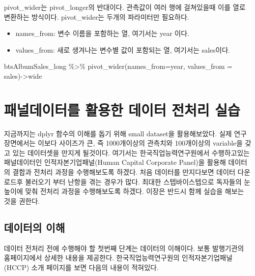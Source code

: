 \documentclass[
]{book}
\newenvironment{Shaded}{\begin{snugshade}}{\end{snugshade}}
\newcommand{\AttributeTok}[1]{\textcolor[rgb]{0.77,0.63,0.00}{#1}}
\newcommand{\FunctionTok}[1]{\textcolor[rgb]{0.00,0.00,0.00}{#1}}
\newcommand{\NormalTok}[1]{#1}
\newcommand{\OtherTok}[1]{\textcolor[rgb]{0.56,0.35,0.01}{#1}}
\newcommand{\SpecialCharTok}[1]{\textcolor[rgb]{0.00,0.00,0.00}{#1}}
\providecommand{\tightlist}{%
  \setlength{\itemsep}{0pt}\setlength{\parskip}{0pt}}
\theoremstyle{definition}
\theoremstyle{definition}
\theoremstyle{definition}
\theoremstyle{definition}
\theoremstyle{remark}
\begin{document}
pivot\_wider는 pivot\_longer의 반대이다. 관측값이 여러 행에 걸쳐있을때 이를 열로 변환하는 방식이다. pivot\_wider는 두개의 파라미터만 필요하다.

\begin{itemize}
\tightlist
\item
  names\_from: 변수 이름을 포함하는 열, 여기서는 year 이다.
\item
  values\_from: 새로 생겨나는 변수별 값이 포함되는 열, 여기서는 sales이다.
\end{itemize}

\begin{Shaded}
\begin{Highlighting}[]
\NormalTok{btsAlbumSales\_long }\SpecialCharTok{\%\textgreater{}\%} 
  \FunctionTok{pivot\_wider}\NormalTok{(}\AttributeTok{names\_from=}\NormalTok{year, }\AttributeTok{values\_from =}\NormalTok{ sales)}\OtherTok{{-}\textgreater{}}\NormalTok{wide}
\end{Highlighting}
\end{Shaded}

\hypertarget{uxd328uxb110uxb370uxc774uxd130uxb97c-uxd65cuxc6a9uxd55c-uxb370uxc774uxd130-uxc804uxcc98uxb9ac-uxc2e4uxc2b5}{%
\section{패널데이터를 활용한 데이터 전처리 실습}\label{uxd328uxb110uxb370uxc774uxd130uxb97c-uxd65cuxc6a9uxd55c-uxb370uxc774uxd130-uxc804uxcc98uxb9ac-uxc2e4uxc2b5}}

지금까지는 dplyr 함수의 이해를 돕기 위해 small dataset을 활용해보았다. 실제 연구 장면에서는 이보다 사이즈가 큰, 즉 1000개이상의 관측치와 100개이상의 variable을 갖고 있는 데이터셋을 만지게 될것이다. 여기서는 한국직업능력연구원에서 수행하고있는 패널데이터인 인적자본기업패널(Human Capital Corporate Panel)을 활용해 데이터의 결합과 전처리 과정을 수행해보도록 하겠다. 처음 데이터를 만지다보면 데이터 다운로드후 불러오기 부터 난항을 겪는 경우가 많다. 최대한 스텝바이스텝으로 독자들의 눈높이에 맞춰 전처리 과정을 수행해보도록 하겠다. 이장은 반드시 함께 실습을 해보는 것을 권한다.

\hypertarget{uxb370uxc774uxd130uxc758-uxc774uxd574}{%
\subsection{데이터의 이해}\label{uxb370uxc774uxd130uxc758-uxc774uxd574}}

데이터 전처리 전에 수행해야 할 첫번째 단계는 데이터의 이해이다. 보통 발행기관의 홈페이지에서 상세한 내용을 제공한다. 한국직업능력연구원의 인적자본기업패널(HCCP) 소개 페이지를 보면 다음의 내용이 적혀있다.
\end{document}
